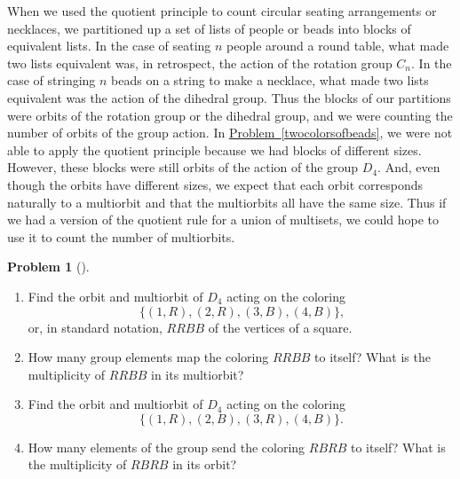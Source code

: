 \documentclass[10pt,]{book}
\theoremstyle{plain}
\theoremstyle{definition}
\newtheorem{activity}[project]{Problem}
\theoremstyle{definition}
\numberwithin{equation}{chapter}
\begin{document}
When we used the quotient principle to count circular seating arrangements or necklaces, we partitioned up a set of lists of people or beads into blocks of equivalent lists. In the case of seating \(n\) people around a round table, what made two lists equivalent was, in retrospect, the action of the rotation group \(C_n\). In the case of stringing \(n\) beads on a string to make a necklace, what made two lists equivalent was the action of the dihedral group. Thus the blocks of our partitions were orbits of the rotation group or the dihedral group, and we were counting the number of orbits of the group action. In \hyperref[twocolorsofbeads]{Problem~\ref{twocolorsofbeads}}, we were not able to apply the quotient principle because we had blocks of different sizes. However, these blocks were still orbits of the action of the group \(D_4\). And, even though the orbits have different sizes, we expect that each orbit corresponds naturally to a multiorbit and that the multiorbits all have the same size. Thus if we had a version of the quotient rule for a union of multisets, we could hope to use it to count the number of multiorbits.%
\begin{activity}[]\marginsymbol[-1em]{} \label{activity-291}
\leavevmode%
\begin{enumerate}[font=\bfseries,label=(\alph*),ref=\alph*]
\item\label{task-219} \marginsymbol[-2.5em]{} \hypertarget{p-1654}{}%
Find the orbit and multiorbit of \(D_4\) acting on the coloring%
\begin{equation*}
\{(1,R),(2,R),(3,B),(4,B)\}\text{,}
\end{equation*}
or, in standard notation, \(RRBB\) of the vertices of a square.%
\item\label{task-220} \marginsymbol[-2.5em]{} \hypertarget{p-1656}{}%
How many group elements map the coloring \(RRBB\) to itself? What is the multiplicity of \(RRBB\) in its multiorbit?%
\item\label{task-221} \marginsymbol[-2.5em]{} \hypertarget{p-1658}{}%
Find the orbit and multiorbit of \(D_4\) acting on the coloring%
\begin{equation*}
\{(1,R),(2,B),(3,R),(4,B)\}\text{.}
\end{equation*}
%
\item\label{task-222} \marginsymbol[-2.5em]{} \hypertarget{p-1660}{}%
How many elements of the group send the coloring \(RBRB\) to itself? What is the multiplicity of \(RBRB\) in its orbit?%
\end{enumerate}
\end{activity}
\end{document}
